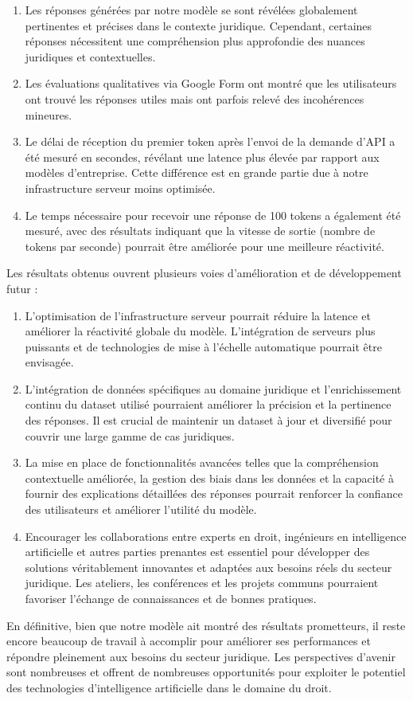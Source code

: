 \begin{enumerate}
    \item Les réponses générées par notre modèle se sont révélées globalement pertinentes et précises dans le contexte juridique. Cependant, certaines réponses nécessitent une compréhension plus approfondie des nuances juridiques et contextuelles.
    \item Les évaluations qualitatives via Google Form ont montré que les utilisateurs ont trouvé les réponses utiles mais ont parfois relevé des incohérences mineures.
    \item Le délai de réception du premier token après l'envoi de la demande d'API a été mesuré en secondes, révélant une latence plus élevée par rapport aux modèles d'entreprise. Cette différence est en grande partie due à notre infrastructure serveur moins optimisée.
    \item Le temps nécessaire pour recevoir une réponse de 100 tokens a également été mesuré, avec des résultats indiquant que la vitesse de sortie (nombre de tokens par seconde) pourrait être améliorée pour une meilleure réactivité.
\end{enumerate}

Les résultats obtenus ouvrent plusieurs voies d'amélioration et de développement futur :

\begin{enumerate}
    \item L'optimisation de l'infrastructure serveur pourrait réduire la latence et améliorer la réactivité globale du modèle. L'intégration de serveurs plus puissants et de technologies de mise à l'échelle automatique pourrait être envisagée.
    \item L'intégration de données spécifiques au domaine juridique et l'enrichissement continu du dataset utilisé pourraient améliorer la précision et la pertinence des réponses. Il est crucial de maintenir un dataset à jour et diversifié pour couvrir une large gamme de cas juridiques.
    \item La mise en place de fonctionnalités avancées telles que la compréhension contextuelle améliorée, la gestion des biais dans les données et la capacité à fournir des explications détaillées des réponses pourrait renforcer la confiance des utilisateurs et améliorer l'utilité du modèle.
    \item Encourager les collaborations entre experts en droit, ingénieurs en intelligence artificielle et autres parties prenantes est essentiel pour développer des solutions véritablement innovantes et adaptées aux besoins réels du secteur juridique. Les ateliers, les conférences et les projets communs pourraient favoriser l'échange de connaissances et de bonnes pratiques.
\end{enumerate}

En définitive, bien que notre modèle ait montré des résultats prometteurs, il reste encore beaucoup de travail à accomplir pour améliorer ses performances et répondre pleinement aux besoins du secteur juridique. Les perspectives d'avenir sont nombreuses et offrent de nombreuses opportunités pour exploiter le potentiel des technologies d'intelligence artificielle dans le domaine du droit.
